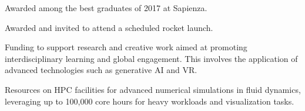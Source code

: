 	\begin{paracol}{2}


		\newline
		Awarded among the best graduates of 2017 at Sapienza.

		\bigskip

		Awarded and invited to attend a scheduled rocket launch.

		\switchcolumn


		\newline
		Funding to support research and creative work aimed at promoting interdisciplinary learning and global engagement. This involves the application of advanced technologies such as generative AI and VR.

		\bigskip

		\newline
		\newline
		Resources on HPC facilities for advanced numerical simulations in fluid dynamics, leveraging up to 100,000 core hours for heavy workloads and visualization tasks.



	\end{paracol}
\else

